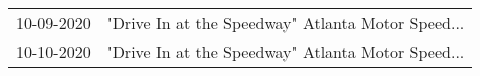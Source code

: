 \begin{supertabular}{ll}
 10-09-2020 &  "Drive In at the Speedway" Atlanta Motor Speed... \\
 10-10-2020 &  "Drive In at the Speedway" Atlanta Motor Speed... \\
\end{supertabular}
